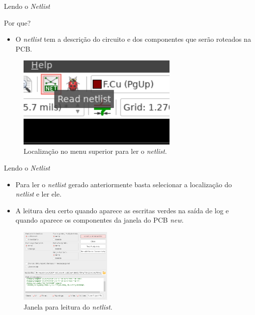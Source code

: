 \documentclass{beamer}
\begin{document}
\begin{frame}{Lendo o \textit{Netlist}}
	\begin{block}{Por que?}
		\begin{itemize}
			\item O \textit{netlist} tem a descrição do circuito e dos componentes que serão roteados na PCB.
		\end{itemize}
	\end{block}
	\begin{figure}
		\centering
		\includegraphics[width=0.7\textwidth]{Imagens/26_read_netlist.png}
		\caption{Localização no menu superior para ler o \textit{netlist}.}
	\end{figure}
\end{frame}

\begin{frame}{Lendo o \textit{Netlist}}
	\begin{itemize}
		\item Para ler o \textit{netlist} gerado anteriormente basta selecionar a localização do \textit{netlist} e ler ele.
		\item A leitura deu certo quando aparece as escritas verdes na saída de log e quando aparece os componentes da janela do PCB \textit{new}.
	\end{itemize}
	\begin{figure}
		\centering
		\includegraphics[width=0.4\textwidth]{Imagens/27_read_netlist_janela.png}
		\caption{Janela para leitura do \textit{netlist}.}
	\end{figure}
\end{frame}
\end{document}
